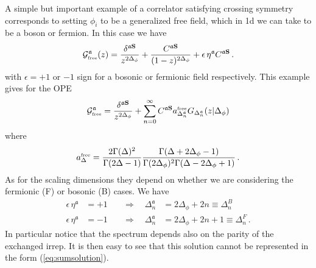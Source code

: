 \documentclass[12pt]{article}
\numberwithin{equation}{section}
\newcommand{\reef}[1]{(\ref{#1})}
\newcommand{\bea}{\begin{eqnarray}}
\newcommand{\eea}{\end{eqnarray}}
\newcommand{\ba}{\begin{equation}\begin{aligned}}
\newcommand{\ea}{\end{aligned}\end{equation}}
\newcommand{\mbf}{\mathbf}
\newcommand{\Df}{{\Delta_\phi}}
\newcommand{\mf}[1]{\mathfrak #1}
\begin{document}
	A simple but important example of a correlator satisfying crossing symmetry corresponds to setting $\phi_i$ to be a generalized free field, which in 1d we can take to be a boson or fermion. In this case we have
	\bea
	\mathcal G_{\mbox{\tiny free}}^{\mf a}(z)=\frac{\delta^{\mf a \mbf S}}{z^{2\Df}}+\frac{C^{\mf a \mbf S}}{(1-z)^{2\Df}}+\epsilon\, \eta^{\mf a}C^{\mf a \mbf S}\,. \label{eq:gfree}
	\eea
	with $\epsilon=+1$ or $-1$ sign for a bosonic or fermionic field respectively. This example gives for the OPE
	\bea
	\mathcal G^{\mf a}_{\mbox{\tiny free}}=\frac{\delta^{\mf a \mbf S}}{z^{2\Df}}+\sum_{n=0}^{\infty} C^{\mf a \mbf S} a^{\mbox{\tiny free}}_{\Delta_n^{\mf a}} G_{\Delta_n^{\mf a}}(z|\Df)
	\eea
	where
	\bea
	a^{\mbox{\tiny free}}_{\Delta}=\frac{2 \Gamma (\Delta)^2}{\Gamma (2 \Delta - 1)} \frac{\Gamma (\Delta + 2
		\Delta_{\phi} - 1)}{\Gamma (2 \Delta_{\phi})^2 \Gamma (\Delta - 2
		\Delta_{\phi} + 1)}\,. \label{eq:opefree}
	\eea
	As for the scaling dimensions they depend on whether we are considering the fermionic (F) or bosonic (B) cases. We have
	\ba
	\epsilon\, \eta^{\mf a}&=+1&\quad \Rightarrow \quad \Delta_n^{\mf a}&=2\Df+2n\equiv \Delta_n^B\\
	\epsilon\, \eta^{\mf a}&=-1&\quad \Rightarrow \quad \Delta_n^{\mf a}&=2\Df+2n+1\equiv \Delta_n^F\,.\label{eq:dimsgff}
	\ea
	In particular notice that the spectrum depends also on the parity of the exchanged irrep. It is then easy to see that this solution cannot be represented in the form \reef{eq:sumsolution}.
	
\end{document}
